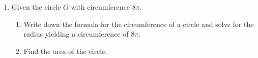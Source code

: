 \documentclass[12pt, twoside]{article}
\begin{document}
\begin{enumerate}
\item Given the circle $O$ with circumference $8\pi$.
\begin{enumerate}
  \item Write down the formula for the circumference of a circle and solve for the radius yielding a circumference of $8\pi$. \vspace{1cm}
  \item Find the area of the circle.
\end{enumerate}

  \end{enumerate}
  \newpage
  \setcounter{page}{1}
\end{document}
